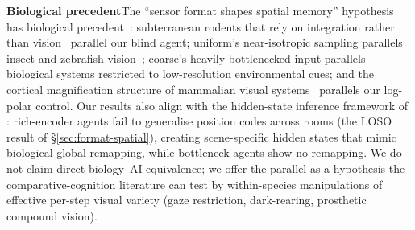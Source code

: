 \documentclass{article}
\begin{document}
\noindent\textbf{Biological precedent}\quad The ``sensor format shapes spatial memory'' hypothesis has biological precedent~\citep{chen2016grid,geva2016remapping,fortin2008blind}: subterranean rodents that rely on integration rather than vision~\citep{kimchi2004molerat} parallel our blind agent; uniform's near-isotropic sampling parallels insect and zebrafish vision~\citep{geva2015spatial,toledo2020cognitive}; coarse's heavily-bottlenecked input parallels biological systems restricted to low-resolution environmental cues; and the cortical magnification structure of mammalian visual systems~\citep{strasburger2011peripheral,rosenholtz2016peripheral} parallels our log-polar control. Our results also align with the hidden-state inference framework of \citet{sanders2020remapping}: rich-encoder agents fail to generalise position codes across rooms (the LOSO result of §\ref{sec:format-spatial}), creating scene-specific hidden states that mimic biological global remapping, while bottleneck agents show no remapping. We do not claim direct biology--AI equivalence; we offer the parallel as a hypothesis the comparative-cognition literature can test by within-species manipulations of effective per-step visual variety (gaze restriction, dark-rearing, prosthetic compound vision).
\end{document}
